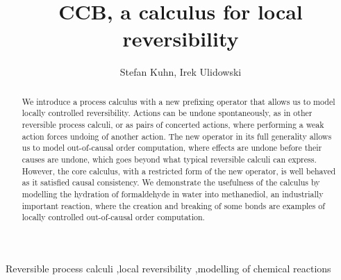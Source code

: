 \documentclass[preprint,12pt]{elsarticle}
\begin{document}
\begin{frontmatter}



\title{CCB, a calculus for local reversibility}


\author{Stefan Kuhn, Irek Ulidowski}

\address{Department of Informatics, University of Leicester, Leicester, LE1 7RH, United Kingdom}

\begin{abstract}
We introduce a process calculus with a new prefixing operator that allows us to model 
locally controlled reversibility. 
Actions can be undone spontaneously, as in other reversible process calculi, or as pairs of concerted 
actions, where performing a weak action forces undoing of another action. The new operator in its 
full generality allows us to model out-of-causal order computation, where effects are undone 
before their causes are undone, which goes beyond what typical reversible calculi can express. 
However, the core calculus, with a restricted form of the new operator, is well behaved as it 
satisfied causal consistency.
We demonstrate the usefulness of the calculus by modelling the hydration of formaldehyde in water 
into methanediol, an industrially important reaction, where the creation and breaking of some 
bonds are examples of locally controlled out-of-causal order computation.
\end{abstract}

\begin{keyword}
Reversible process calculi \sep local reversibility \sep modelling of chemical reactions
\end{keyword}

\end{frontmatter}
\end{document}
